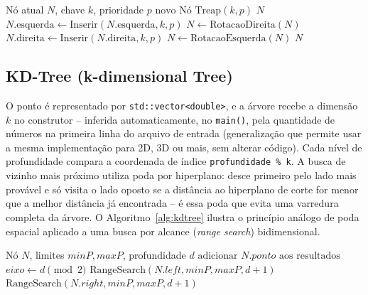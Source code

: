 \documentclass[conference]{IEEEtran}
\begin{document}
\begin{algorithm}[H]
\caption{Inserção e Remoção por Rebaixamento na Treap}
\label{alg:treap}
\begin{algorithmic}[1]
\REQUIRE Nó atual $N$, chave $k$, prioridade $p$
    \RETURN $\text{novo Nó Treap}(k, p)$
\ENDIF
{}
    \RETURN $N$ 
\ENDIF
{}
    \STATE $N.\text{esquerda}
    \gets \text{Inserir}(N.\text{esquerda}, k, p)$
        \STATE $N \gets \text{RotacaoDireita}(N)$
    \ENDIF
\ELSE
    \STATE $N.\text{direita}
    \gets \text{Inserir}(N.\text{direita}, k, p)$
        \STATE $N \gets \text{RotacaoEsquerda}(N)$
    \ENDIF
\ENDIF
\RETURN $N$
\end{algorithmic}
\end{algorithm}

\subsection{KD-Tree (k-dimensional Tree)}
O ponto é representado por \texttt{std::vector<double>}, e a árvore recebe a dimensão $k$ no construtor -- inferida automaticamente, no \texttt{main()}, pela quantidade de números na primeira linha do arquivo de entrada (generalização que permite usar a mesma implementação para 2D, 3D ou mais, sem alterar código). Cada nível de profundidade compara a coordenada de índice \texttt{profundidade \% k}. A busca de vizinho mais próximo utiliza poda por hiperplano: desce primeiro pelo lado mais provável e só visita o lado oposto se a distância ao hiperplano de corte for menor que a melhor distância já encontrada -- é essa poda que evita uma varredura completa da árvore. O Algoritmo~\ref{alg:kdtree} ilustra o princípio análogo de poda espacial aplicado a uma busca por alcance (\textit{range search}) bidimensional.

\begin{algorithm}[H]
\caption{Busca por Alcance 2D na KD-Tree}
\label{alg:kdtree}
\begin{algorithmic}[1]
\REQUIRE Nó $N$, limites $minP, maxP$, profundidade $d$
    \RETURN
\ENDIF
{}
    \STATE $\text{adicionar } N.ponto \text{ aos resultados}$
\ENDIF
\STATE $eixo \gets d \pmod 2$
    \STATE $\text{RangeSearch}(N.left, minP, maxP, d+1)$
\ENDIF
{}
    \STATE $\text{RangeSearch}(N.right, minP, maxP, d+1)$
\ENDIF
\end{algorithmic}
\end{algorithm}
\end{document}
